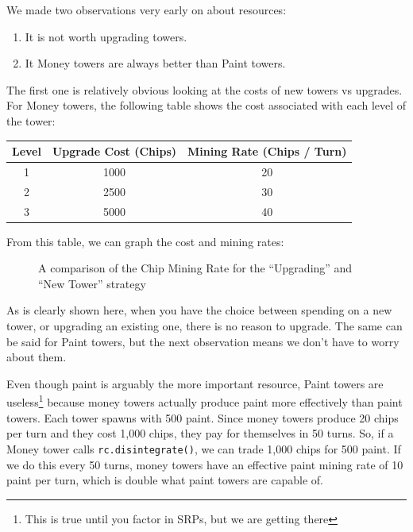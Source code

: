 We made two observations very early on about resources:
\begin{enumerate}
  \item It is not worth upgrading towers.
  \item It Money towers are always better than Paint towers.
\end{enumerate}
The first one is relatively obvious looking at the costs of new towers vs upgrades. For Money towers, the following table shows the cost associated with each level of the tower:
\begin{center}
  \begin{tabular}{c | c | c}
    Level & Upgrade Cost (Chips) & Mining Rate (Chips / Turn) \\
    \hline 
    1 & 1000 & 20   \\
    2 & 2500 & 30   \\
    3 & 5000 & 40   \\
  \end{tabular}
\end{center}
From this table, we can graph the cost and mining rates:
\begin{figure}[H]
  \centering
  \caption{A comparison of the Chip Mining Rate for the ``Upgrading'' and ``New Tower'' strategy}
\end{figure}
As is clearly shown here, when you have the choice between spending on a new tower, or upgrading an existing one, there is no reason to upgrade. The same can be said for Paint towers, but the next observation means we don't have to worry about them.

\medskip

Even though paint is arguably the more important resource, Paint towers are useless\footnote{This is true until you factor in SRPs, but we are getting there} because money towers actually produce paint more effectively than paint towers. Each tower spawns with 500 paint. Since money towers produce 20 chips per turn and they cost 1,000 chips, they pay for themselves in 50 turns. So, if a Money tower calls \verb|rc.disintegrate()|, we can trade 1,000 chips for 500 paint. If we do this every 50 turns, money towers have an effective paint mining rate of 10 paint per turn, which is double what paint towers are capable of.

